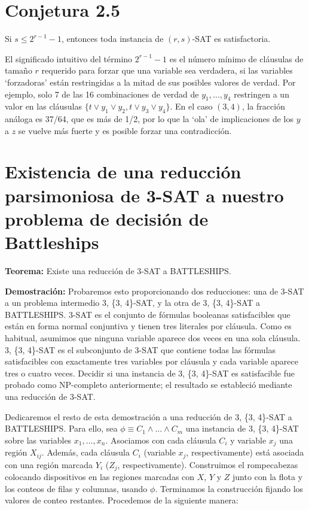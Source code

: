 \documentclass{article}
\begin{document}
\section*{Conjetura 2.5}
Si \( s \leq 2^{r-1} - 1 \), entonces toda instancia de \( (r,s) \)-SAT es satisfactoria.

El significado intuitivo del término \( 2^{r-1} - 1 \) es el número mínimo de cláusulas de tamaño \( r \) requerido para forzar que una variable sea verdadera, si las variables ‘forzadoras’ están restringidas a la mitad de sus posibles valores de verdad. Por ejemplo, solo 7 de las 16 combinaciones de verdad de \( y_1, \ldots, y_4 \) restringen a un valor en las cláusulas \( \{t \lor y_1 \lor y_2, t \lor y_3 \lor y_4\} \). En el caso \( (3,4) \), la fracción análoga es 37/64, que es más de 1/2, por lo que la ‘ola’ de implicaciones de los \( y \) a \( z \) se vuelve más fuerte y es posible forzar una contradicción.
\section{Existencia de una reducción parsimoniosa de 3-SAT a nuestro problema de decisión de Battleships}

\textbf{Teorema:} Existe una reducción  de 3-SAT a BATTLESHIPS.

\textbf{Demostración:} Probaremos esto proporcionando dos reducciones: una de 3-SAT a un problema intermedio 3, \{3, 4\}-SAT, y la otra de 3, \{3, 4\}-SAT a BATTLESHIPS. 3-SAT es el conjunto de fórmulas booleanas satisfacibles que están en forma normal conjuntiva y tienen tres literales por cláusula. Como es habitual, asumimos que ninguna variable aparece dos veces en una sola cláusula. 3, \{3, 4\}-SAT es el subconjunto de 3-SAT que contiene todas las fórmulas satisfacibles con exactamente tres variables por cláusula y cada variable aparece tres o cuatro veces. Decidir si una instancia de 3, \{3, 4\}-SAT es satisfacible fue probado como NP-completo anteriormente; el resultado se estableció mediante una reducción  de 3-SAT.

Dedicaremos el resto de esta demostración a una reducción  de 3, \{3, 4\}-SAT a BATTLESHIPS. Para ello, sea $\phi \equiv C_1 \land \ldots \land C_m$ una instancia de 3, \{3, 4\}-SAT sobre las variables $x_1, \ldots, x_n$. Asociamos con cada cláusula $C_i$ y variable $x_j$ una región $X_{ij}$. Además, cada cláusula $C_i$ (variable $x_j$, respectivamente) está asociada con una región marcada $Y_i$ ($Z_j$, respectivamente). Construimos el rompecabezas colocando dispositivos en las regiones marcadas con $X$, $Y$ y $Z$ junto con la flota y los conteos de filas y columnas, usando $\phi$. Terminamos la construcción fijando los valores de conteo restantes. Procedemos de la siguiente manera:
\end{document}
